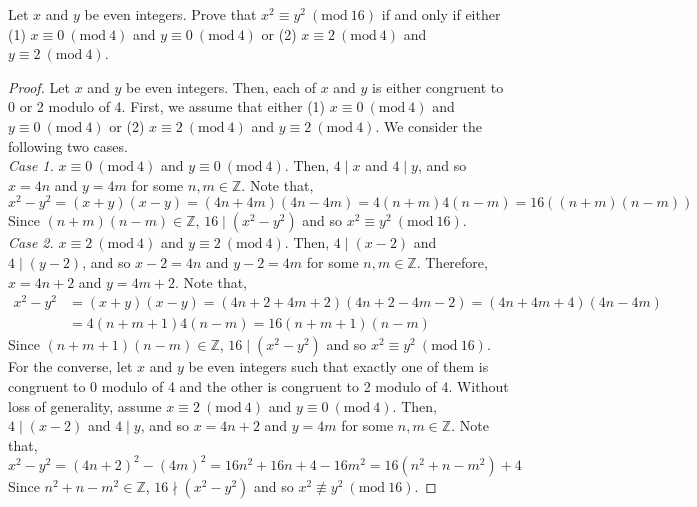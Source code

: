 \documentclass[12pt]{article}
\newcommand{\Z}{\mathbb{Z}}
\newcommand{\Mod}[1]{\ (\mathrm{mod}\ #1)}
\newenvironment{problem}[2][Problem]{\begin{trivlist}
		\item[\hskip \labelsep {\bfseries #1}\hskip \labelsep {\bfseries #2.}]}{\end{trivlist}}
\begin{document}
\begin{problem}{24}
	Let $x$ and $y$ be even integers. Prove that $x^{2} \equiv y^{2} \Mod {16}$ if and only if either (1) $x \equiv 0 \Mod 4$ and $y \equiv 0 \Mod 4$ or (2) $x\equiv 2 \Mod 4$ and $y \equiv 2 \Mod 4$.
	\begin{proof}
		Let $x$ and $y$ be even integers. Then, each of $x$ and $y$ is either congruent to 0 or 2 modulo of 4. First, we assume that  either (1) $x \equiv 0 \Mod 4$ and $y \equiv 0 \Mod 4$ or (2) $x\equiv 2 \Mod 4$ and $y \equiv 2 \Mod 4$. We consider the following two cases.\\
		\textit{Case 1.} $x \equiv 0 \Mod 4$ and $y \equiv 0 \Mod 4$. Then, $4\mid x$ and $4\mid y$, and so $x = 4n$ and $y = 4m$ for some $n,m\in \Z$. Note that,
		\begin{equation*}
			x^{2} -y ^{2} = (x+y)(x-y) = (4n +4m)(4n-4m) = 4(n+m)4(n-m) = 16((n+m)(n-m)) 
		\end{equation*}
		Since $(n+m)(n-m)\in \Z$, $16 \mid (x^{2} -y ^{2})$ and so $x^{2} \equiv y^{2} \Mod {16}$.\\
		\textit{Case 2.} $x\equiv 2 \Mod 4$ and $y \equiv 2 \Mod 4$. Then, $4\mid (x-2)$ and $4\mid (y-2)$, and so $x-2 = 4n$ and $y-2 = 4m$ for some $n,m\in \Z$. Therefore, $x = 4n+2$ and $y = 4m +2$. Note that,
		\begin{align*}
			x^{2}-y^{2} &= (x+y)(x-y) = (4n+2+4m+2)(4n+2-4m-2) = (4n+4m+4)(4n-4m) \\
			&= 4(n+m+1)4(n-m) = 16(n+m+1)(n-m)
		\end{align*}
		Since $(n+m+1)(n-m) \in \Z$, $16\mid (x^{2}-y^{2})$ and so $x^{2} \equiv y^{2} \Mod {16}$.\\
		 
		For the converse, let $x$ and $y$ be even integers such that exactly one of them is congruent to 0 modulo of 4 and the other is congruent to 2 modulo of 4. Without loss of generality, assume $x \equiv 2 \Mod 4$ and $y\equiv 0 \Mod 4$. Then, $4\mid (x-2)$ and $4\mid y$, and so $x = 4n+2$ and $y =4m$ for some $n,m \in \Z$. Note that,
		\begin{equation*}
			x^{2}-y^{2} = (4n+2)^{2}-(4m)^{2} = 16n^{2} +16n +4-16m^{2} = 16(n^{2}+n-m^{2})+4
		\end{equation*}
	Since $n^{2}+n-m^{2}\in \Z$, $16\nmid (x^{2}-y^{2})$ and so $x^{2} \not\equiv y^{2} \Mod{16}$.
	\end{proof}
\end{problem} 

	
\end{document}
